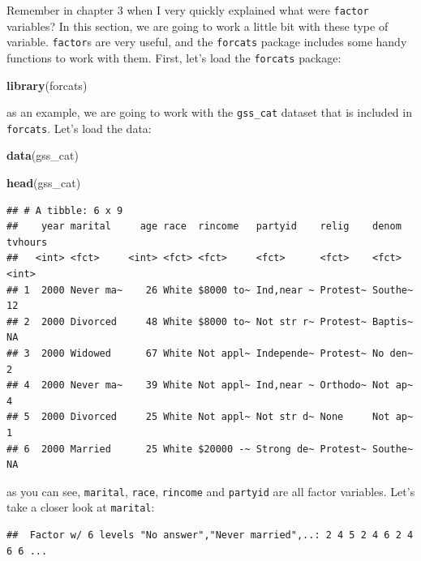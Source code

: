 \documentclass[]{gitbook}
\newenvironment{Shaded}{\begin{snugshade}}{\end{snugshade}}
\newcommand{\KeywordTok}[1]{\textcolor[rgb]{0.13,0.29,0.53}{\textbf{#1}}}
\newcommand{\NormalTok}[1]{#1}
\newcommand{\OperatorTok}[1]{\textcolor[rgb]{0.81,0.36,0.00}{\textbf{#1}}}
\begin{document}
Remember in chapter 3 when I very quickly explained what were \texttt{factor} variables? In this section,
we are going to work a little bit with these type of variable. \texttt{factor}s are very useful, and the
\texttt{forcats} package includes some handy functions to work with them. First, let's load the \texttt{forcats} package:

\begin{Shaded}
\begin{Highlighting}[]
\KeywordTok{library}\NormalTok{(forcats)}
\end{Highlighting}
\end{Shaded}

as an example, we are going to work with the \texttt{gss\_cat} dataset that is included in \texttt{forcats}. Let's
load the data:

\begin{Shaded}
\begin{Highlighting}[]
\KeywordTok{data}\NormalTok{(gss_cat)}

\KeywordTok{head}\NormalTok{(gss_cat)}
\end{Highlighting}
\end{Shaded}

\begin{verbatim}
## # A tibble: 6 x 9
##    year marital     age race  rincome   partyid    relig    denom   tvhours
##   <int> <fct>     <int> <fct> <fct>     <fct>      <fct>    <fct>     <int>
## 1  2000 Never ma~    26 White $8000 to~ Ind,near ~ Protest~ Southe~      12
## 2  2000 Divorced     48 White $8000 to~ Not str r~ Protest~ Baptis~      NA
## 3  2000 Widowed      67 White Not appl~ Independe~ Protest~ No den~       2
## 4  2000 Never ma~    39 White Not appl~ Ind,near ~ Orthodo~ Not ap~       4
## 5  2000 Divorced     25 White Not appl~ Not str d~ None     Not ap~       1
## 6  2000 Married      25 White $20000 -~ Strong de~ Protest~ Southe~      NA
\end{verbatim}

as you can see, \texttt{marital}, \texttt{race}, \texttt{rincome} and \texttt{partyid} are all factor variables. Let's take a closer
look at \texttt{marital}:

\begin{Shaded}
\end{Shaded}

\begin{verbatim}
##  Factor w/ 6 levels "No answer","Never married",..: 2 4 5 2 4 6 2 4 6 6 ...
\end{verbatim}
\end{document}
